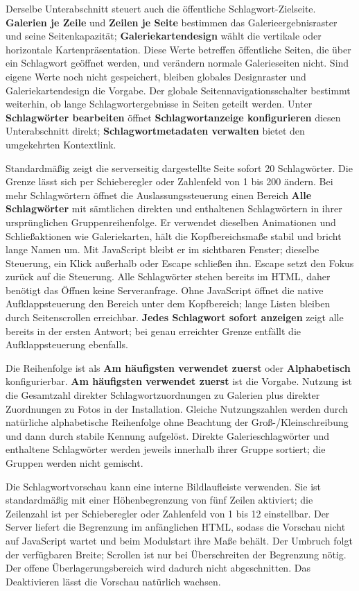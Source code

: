 \documentclass[11pt,a4paper]{article}
\newcommand{\ui}[1]{\textbf{#1}}
\begin{document}
Derselbe Unterabschnitt steuert auch die öffentliche Schlagwort-Zielseite.
\ui{Galerien je Zeile} und \ui{Zeilen je Seite} bestimmen das
Galerieergebnisraster und seine Seitenkapazität; \ui{Galeriekartendesign} wählt
die vertikale oder horizontale Kartenpräsentation. Diese Werte betreffen
öffentliche Seiten, die über ein Schlagwort geöffnet werden, und verändern
normale Galerieseiten nicht. Sind eigene Werte noch nicht gespeichert, bleiben
globales Designraster und Galeriekartendesign die Vorgabe. Der globale
Seitennavigationsschalter bestimmt weiterhin, ob lange Schlagwortergebnisse in
Seiten geteilt werden. Unter \ui{Schlagwörter bearbeiten} öffnet
\ui{Schlagwortanzeige konfigurieren} diesen Unterabschnitt direkt;
\ui{Schlagwortmetadaten verwalten} bietet den umgekehrten Kontextlink.

Standardmäßig zeigt die serverseitig dargestellte Seite sofort 20 Schlagwörter.
Die Grenze lässt sich per Schieberegler oder Zahlenfeld von 1 bis 200 ändern.
Bei mehr Schlagwörtern öffnet die Auslassungssteuerung einen Bereich \ui{Alle
Schlagwörter} mit sämtlichen direkten und enthaltenen Schlagwörtern in ihrer
ursprünglichen Gruppenreihenfolge. Er verwendet dieselben Animationen und
Schließaktionen wie Galeriekarten, hält die Kopfbereichsmaße stabil und bricht
lange Namen um. Mit JavaScript bleibt er im sichtbaren Fenster; dieselbe
Steuerung, ein Klick außerhalb oder Escape schließen ihn. Escape setzt den Fokus
zurück auf die Steuerung. Alle Schlagwörter stehen bereits im HTML, daher
benötigt das Öffnen keine Serveranfrage. Ohne JavaScript öffnet die native
Aufklappsteuerung den Bereich unter dem Kopfbereich; lange Listen bleiben durch
Seitenscrollen erreichbar. \ui{Jedes Schlagwort sofort anzeigen} zeigt alle
bereits in der ersten Antwort; bei genau erreichter Grenze entfällt die
Aufklappsteuerung ebenfalls.

Die Reihenfolge ist als \ui{Am häufigsten verwendet zuerst} oder
\ui{Alphabetisch} konfigurierbar. \ui{Am häufigsten verwendet zuerst} ist die
Vorgabe. Nutzung ist die Gesamtzahl direkter Schlagwortzuordnungen zu Galerien
plus direkter Zuordnungen zu Fotos in der Installation. Gleiche Nutzungszahlen
werden durch natürliche alphabetische Reihenfolge ohne Beachtung der
Groß-/Kleinschreibung und dann durch stabile Kennung aufgelöst. Direkte
Galerieschlagwörter und enthaltene Schlagwörter werden jeweils innerhalb ihrer
Gruppe sortiert; die Gruppen werden nicht gemischt.

Die Schlagwortvorschau kann eine interne Bildlaufleiste verwenden. Sie ist
standardmäßig mit einer Höhenbegrenzung von fünf Zeilen aktiviert; die
Zeilenzahl ist per Schieberegler oder Zahlenfeld von 1 bis 12 einstellbar. Der
Server liefert die Begrenzung im anfänglichen HTML, sodass die Vorschau nicht
auf JavaScript wartet und beim Modulstart ihre Maße behält. Der Umbruch folgt
der verfügbaren Breite; Scrollen ist nur bei Überschreiten der Begrenzung nötig.
Der offene Überlagerungsbereich wird dadurch nicht abgeschnitten. Das
Deaktivieren lässt die Vorschau natürlich wachsen.
\end{document}
